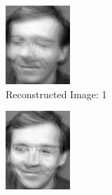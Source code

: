 \documentclass[12pt]{article}
\begin{document}
\begin{figure}
\begin{subfigure}[b]{0.20\textwidth}
		\includegraphics[width=\textwidth]{Task4.3_Images/ReconstructedImage1.jpg}
		\caption{Reconstructed Image: 1}
	\end{subfigure}\quad
	\begin{subfigure}[b]{0.20\textwidth}
		\includegraphics[width=\textwidth]{Task4.3_Images/ReconstructedImage2.jpg}

\end{subfigure}
\end{figure}
\end{document}
